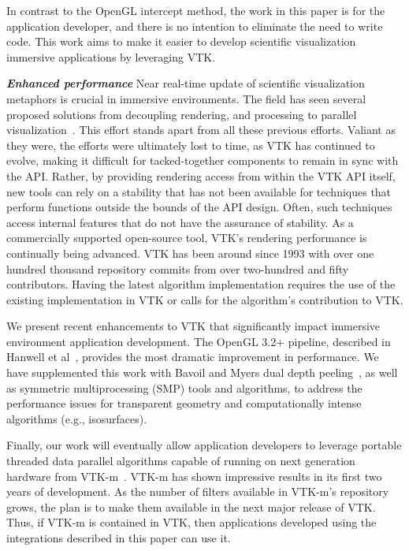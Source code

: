 In contrast to the OpenGL intercept method, the work in this paper is for the application developer, and there is no intention to eliminate the need to write code. This work aims to make  it easier to develop scientific visualization immersive applications by leveraging VTK.

\textit{\textbf{Enhanced performance}} Near real-time update of scientific visualization metaphors is crucial in immersive environments.
The field has seen several proposed solutions from decoupling rendering, and processing to parallel visualization~\cite{Bryson:1996, van2000vista}.
This effort stands apart from all these previous efforts. Valiant
as they were, the efforts were ultimately lost to time, as VTK has continued to
evolve, making it difficult for tacked-together components to remain in
sync with the API.
Rather, by providing rendering access from within the VTK API itself, new
tools can rely on a stability that has not been available for techniques
that perform functions outside the bounds of the API design. Often, such techniques access
internal features that do not have the assurance of stability.
As a commercially supported open-source tool, VTK's rendering performance is
continually being advanced.
VTK has been around since 1993 with over one hundred thousand repository commits from over two-hundred and fifty contributors.
Having the latest algorithm implementation requires the use of the existing implementation in VTK or calls for the algorithm's contribution to VTK.

We present recent enhancements to VTK that significantly impact immersive
environment application development. The OpenGL 3.2+ pipeline, described in Hanwell et al~\cite{Hanwell:2015}, provides the most dramatic improvement in performance. We have supplemented this work with Bavoil and Myers dual depth peeling~\cite{Bavoil:2008}, as well as symmetric multiprocessing (SMP) tools and algorithms, to address the performance issues for transparent geometry and computationally intense algorithms (e.g., isosurfaces).

Finally, our work will eventually allow application developers to leverage portable threaded data parallel algorithms capable of running on next generation hardware from VTK-m~\cite{Moreland:2016}. VTK-m has shown impressive results in its first two years of development. As the number of filters available in VTK-m's repository grows, the plan is to make them available in the next major release of VTK. Thus, if VTK-m is contained in VTK, then applications developed using the integrations described in this paper can use it.
